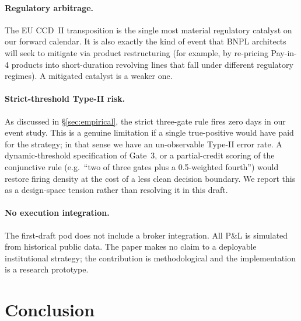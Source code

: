 \documentclass[11pt,letterpaper]{article}
\begin{document}
\paragraph{Regulatory arbitrage.}
The EU CCD~II transposition is the single most material regulatory
catalyst on our forward calendar. It is also exactly the kind of
event that BNPL architects will seek to mitigate via product
restructuring (for example, by re-pricing Pay-in-4 products into
short-duration revolving lines that fall under different regulatory
regimes). A mitigated catalyst is a weaker one.

\paragraph{Strict-threshold Type-II risk.}
As discussed in \S\ref{sec:empirical}, the strict three-gate rule fires
zero days in our event study. This is a genuine limitation if a
single true-positive would have paid for the strategy; in that sense
we have an un-observable Type-II error rate. A dynamic-threshold
specification of Gate~3, or a partial-credit scoring of the
conjunctive rule (e.g.\ ``two of three gates plus a 0.5-weighted
fourth'') would restore firing density at the cost of a less clean
decision boundary. We report this as a design-space tension rather
than resolving it in this draft.

\paragraph{No execution integration.}
The first-draft pod does not include a broker integration. All P\&L
is simulated from historical public data. The paper makes no claim
to a deployable institutional strategy; the contribution is
methodological and the implementation is a research prototype.


\section{Conclusion}
\label{sec:conclusion}
\end{document}
